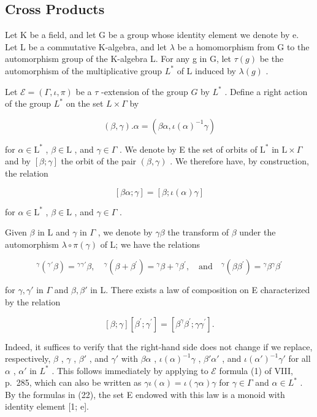 \subsection{Cross Products}

Let K be a field, and let G be a group whose identity element we denote by e. Let L be a commutative K-algebra, and let \(\lambda\) be a homomorphism from G to the automorphism group of the K-algebra L. For any g in G, let \(\tau(g)\) be the automorphism of the multiplicative group \(L^{*}\) of L induced by \(\lambda(g)\) .

Let \(\mathcal{E} = (\Gamma, \iota, \pi)\) be a \(\tau\) -extension of the group \(G\) by \(L^*\) . Define a right action of the group \(L^*\) on the set \(L \times \Gamma\) by

\[
(\beta , \gamma). \alpha = (\beta \alpha , \iota (\alpha) ^ {- 1} \gamma)\tag{20}
\]

for \(\alpha \in \mathrm{L}^*\) , \(\beta \in \mathrm{L}\) , and \(\gamma \in \Gamma\) . We denote by E the set of orbits of \(\mathrm{L}^*\) in \(\mathrm{L} \times \Gamma\) and by \([\beta; \gamma]\) the orbit of the pair \((\beta, \gamma)\) . We therefore have, by construction, the relation

\[
[ \beta \alpha ; \gamma ] = [ \beta ; \iota (\alpha) \gamma ]\tag{21}
\]

for \(\alpha\in\mathrm{L}^{*}\) , \(\beta\in\mathrm{L}\) , and \(\gamma\in\Gamma\) .

Given \(\beta\) in L and \(\gamma\) in \(\Gamma\) , we denote by \(\gamma\beta\) the transform of \(\beta\) under the automorphism \(\lambda\circ\pi(\gamma)\) of L; we have the relations

\[
{ } ^ { \gamma } ( { } ^ { \gamma } { } ^ { \prime } \beta ) = { } ^ { \gamma } { } ^ { \gamma } { } ^ { \prime } \beta   , \quad { } ^ { \gamma } ( \beta + \beta ^ { \prime } ) = { } ^ { \gamma } \beta + { } ^ { \gamma } \beta ^ { \prime }   , \quad \text {and} \quad { } ^ { \gamma } ( \beta \beta ^ { \prime } ) = { } ^ { \gamma } \beta   { } ^ { \gamma } \beta ^ { \prime }\tag{22}
\]

for \(\gamma,\gamma'\) in \(\Gamma\) and \(\beta,\beta'\) in L. There exists a law of composition on E characterized by the relation

\[
[ \beta ; \gamma ] [ \beta^ {\prime}; \gamma^ {\prime} ] = [ \beta^ {\gamma} \beta^ {\prime}; \gamma \gamma^ {\prime} ].\tag{23}
\]

Indeed, it suffices to verify that the right-hand side does not change if we replace, respectively, \(\beta\) , \(\gamma\) , \(\beta'\) , and \(\gamma'\) with \(\beta\alpha\) , \(\iota(\alpha)^{-1}\gamma\) , \(\beta'\alpha'\) , and \(\iota(\alpha')^{-1}\gamma'\) for all \(\alpha\) , \(\alpha'\) in \(L^*\) . This follows immediately by applying to \(\mathcal{E}\) formula (1) of VIII, p.~285, which can also be written as \(\gamma\iota(\alpha) = \iota(\gamma\alpha)\gamma\) for \(\gamma \in \Gamma\) and \(\alpha \in L^*\) . By the formulas in (22), the set E endowed with this law is a monoid with identity element {[}1; e{]}.

